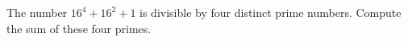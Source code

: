 The number $16^4+16^2+1$ is divisible by four distinct prime numbers. Compute the sum of these four primes.